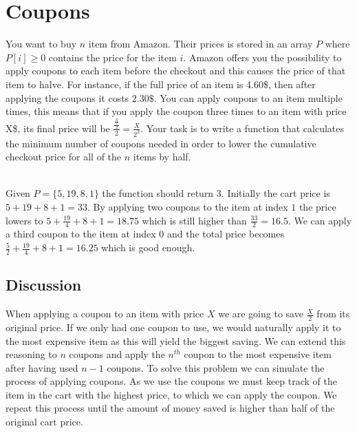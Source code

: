 \section{Coupons}
\begin{exercise}
You want to buy $n$ item from Amazon. Their prices is stored in an array $P$ where $P[i] \geq 0$ contains the price for the item $i$. Amazon offers you the possibility to apply coupons to each item before the checkout and this causes the price of that item to halve.
For instance, if the full price of an item is 4.60\$, then after applying the coupons it costs $2.30\$$. You can apply coupons to an item multiple times, this means that if you apply the coupon three times to an item with price X\$, its final price will be $\frac{\frac{\frac{X}{2}}{2}}{2} = \frac{X}{2^3}$.
Your task is to write a function that calculates the minimum number of coupons needed in order to lower the cumulative checkout price for all of the $n$ items by half. 

    \begin{example}
        \label{ex:coupons:example1}
        \hfill \\
        Given $P=\{5,19,8,1\}$ the function should return $3$.  Initially the cart price is $5+19+8+1=33$. By applying two coupons to the item at index $1$ the price lowers to $5+\frac{19}{4}+8+1 = 18.75$ which is still higher than $\frac{33}{2}=16.5$. We can apply a third coupon to the item at index $0$ and the total price becomes $\frac{5}{2}+\frac{19}{4}+8+1 = 16.25$ which is good enough. 
    \end{example}
    
\end{exercise}
 

\subsection{Discussion}
When applying a coupon to an item with price $X$ we are going to save $\frac{X}{2}$ from its original price. If we only had one coupon to use, we would naturally apply it to the most expensive item as this will yield the biggest saving. We can extend this reasoning to $n$ coupons and apply the $n^{th}$ coupon to the most expensive item after having used $n-1$ coupons. 
To solve this problem we can simulate the process of applying coupons. As we use the coupons we must keep track of the item in the cart with the highest price, to which we can apply the coupon. We repeat this process until the amount of money saved is higher than half of the original cart price. 

